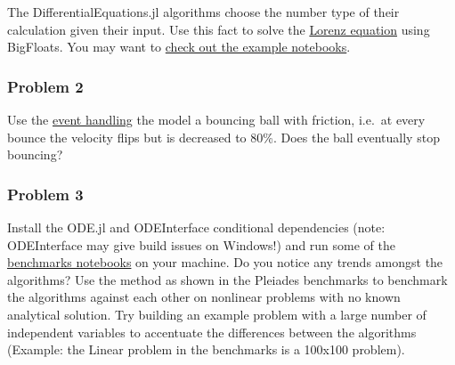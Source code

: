 \documentclass[11pt]{article}
\begin{document}
The DifferentialEquations.jl algorithms choose the number type of their
calculation given their input. Use this fact to solve the
\href{https://en.wikipedia.org/wiki/Lorenz_system}{Lorenz equation}
using BigFloats. You may want to
\href{https://github.com/JuliaDiffEq/DifferentialEquations.jl/tree/master/examples}{check
out the example notebooks}.

\subsubsection{Problem 2}\label{problem-2}

Use the
\href{http://juliadiffeq.github.io/DifferentialEquations.jl/latest/man/callback_functions.html}{event
handling} the model a bouncing ball with friction, i.e.~at every bounce
the velocity flips but is decreased to 80\%. Does the ball eventually
stop bouncing?

\subsubsection{Problem 3}\label{problem-3}

Install the ODE.jl and ODEInterface conditional dependencies (note:
ODEInterface may give build issues on Windows!) and run some of the
\href{https://github.com/JuliaDiffEq/DifferentialEquations.jl/tree/master/benchmarks}{benchmarks
notebooks} on your machine. Do you notice any trends amongst the
algorithms? Use the method as shown in the Pleiades benchmarks to
benchmark the algorithms against each other on nonlinear problems with
no known analytical solution. Try building an example problem with a
large number of independent variables to accentuate the differences
between the algorithms (Example: the Linear problem in the benchmarks is
a 100x100 problem).


    
    
    
    
\end{document}
